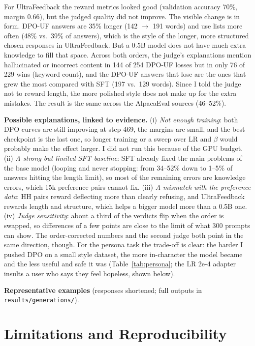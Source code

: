 \documentclass[10pt,a4paper]{article}
\newcommand{\code}[1]{\texttt{\small #1}}
\begin{document}
For UltraFeedback the reward metrics looked good (validation accuracy 70\%, margin 0.66), but the judged quality did not improve. The visible
change is in form. DPO-UF answers are 35\% longer (142 $\to$ 191 words) and use lists more often (48\% vs.\ 39\% of answers), which is the style of
the longer, more structured chosen responses in UltraFeedback. But a 0.5B model does not have much extra knowledge to fill that space. Across both
orders, the judge's explanations mention hallucinated or incorrect content in 144 of 254 DPO-UF losses but in only 76 of 229 wins (keyword
count), and the DPO-UF answers that lose are the ones that grew the most compared with SFT (197 vs.\ 129 words). Since I told the judge not to
reward length, the more polished style does not make up for the extra mistakes. The result is the same across the AlpacaEval sources (46--52\%).

\textbf{Possible explanations, linked to evidence.} (i) \emph{Not enough training}: both DPO curves are still improving at step 469, the margins
are small, and the best checkpoint is the last one, so longer training or a sweep over LR and $\beta$ would probably make the effect larger. I
did not run this because of the GPU budget. (ii) \emph{A strong but limited SFT baseline}: SFT already fixed the main problems of the base model
(looping and never stopping: from 34--52\% down to 1--5\% of answers hitting the length limit), so most of the remaining errors are knowledge
errors, which 15k preference pairs cannot fix. (iii) \emph{A mismatch with the preference data}: HH pairs reward deflecting more than clearly
refusing, and UltraFeedback rewards length and structure, which helps a bigger model more than a 0.5B one. (iv) \emph{Judge sensitivity}: about a
third of the verdicts flip when the order is swapped, so differences of a few points are close to the limit of what 300 prompts can show. The
order-corrected numbers and the second judge both point in the same direction, though. For the persona task the trade-off is clear: the harder I
pushed DPO on a small style dataset, the more in-character the model became and the less useful and safe it was (Table~\ref{tab:persona}; the LR
2e-4 adapter insults a user who says they feel hopeless, shown below).

\textbf{Representative examples} (responses shortened; full outputs in \code{results/generations/}).


\section{Limitations and Reproducibility}
\end{document}
